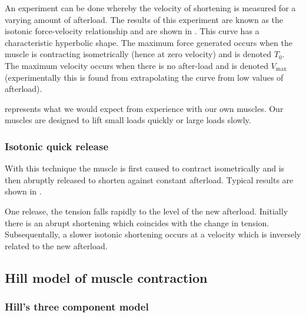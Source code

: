 An experiment can be done whereby the velocity of shortening is measured for a
varying amount of afterload. The results of this experiment are known as the
isotonic force-velocity relationship and are shown in
. This curve has a characteristic hyperbolic
shape. The maximum force generated occurs when the muscle is contracting
isometrically (hence at zero velocity) and is denoted $T_{0}$. The maximum
velocity occurs when there is no after-load and is denoted $V_{\text{max}}$
(experimentally this is found from extrapolating the curve from low values of
afterload).


 represents what we would expect from experience
with our own muscles. Our muscles are designed to lift small loads quickly or
large loads slowly.

\subsubsection{Isotonic quick release}

With this technique the muscle is first caused to contract isometrically and
is then abruptly released to shorten against constant afterload. Typical
results are shown in .


One release, the tension falls rapidly to the level of the new
afterload. Initially there is an abrupt shortening which coincides with the
change in tension. Subsequentally, a slower isotonic shortening occurs at a
velocity which is inversely related to the new afterload.

\subsection{Hill model of muscle contraction}

\subsubsection{Hill's three component model}

